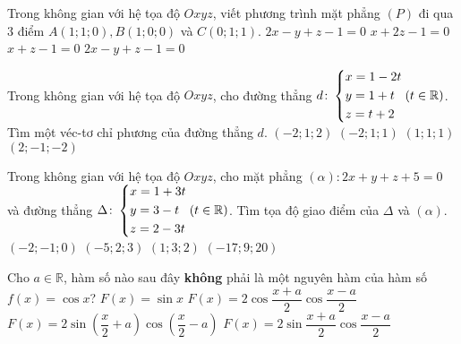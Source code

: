 \begin{ex}%
	Trong không gian với hệ tọa độ $Oxyz$, viết phương trình mặt phẳng $(P)$ đi qua $3$ điểm $A(1;1;0),B(1;0;0)$ và $C(0;1;1)$.
	\choice
	{$2x-y+z-1=0$}
	{$x+2z-1=0$}
	{\True $x+z-1=0$}
	{$2x-y+z-1=0$}
\end{ex}
\begin{ex}%
	Trong không gian với hệ tọa độ $Oxyz$, cho đường thẳng $d \colon \left\{\begin{aligned}&x=1-2t \\&y=1+t \\&z=t+2\end{aligned}\right. (t\in \mathbb{R})$. Tìm một véc-tơ chỉ phương của đường thẳng $d$.
	\choice
	{$(-2;1;2)$}
	{\True $(-2;1;1)$}
	{$(1;1;1)$}
	{$(2;-1;-2)$}
\end{ex}
\begin{ex}%
	Trong không gian với hệ tọa độ $Oxyz$, cho mặt phẳng $(\alpha)\colon 2x+y+z+5=0$ và đường thẳng $ \Delta \colon \left\{\begin{aligned}&x=1+3t \\&y=3-t \\&z=2-3t\end{aligned}\right.(t\in \mathbb{R})$. Tìm tọa độ giao điểm của $ \Delta $ và $\left(\alpha \right)$.
	\choice
	{$(-2;-1;0)$}
	{$(-5;2;3)$}
	{$(1;3;2)$}
	{\True $(-17;9;20)$}
\end{ex}
\begin{ex}%
	Cho $a\in \mathbb{R}$, hàm số nào sau đây \textbf{không} phải là một nguyên hàm của hàm số $f(x)=\cos x$?
	\choice
	{$F(x)=\sin x$}
	{\True $F(x)=2\cos \dfrac{x+a}{2}\cos \dfrac{x-a}{2}$}
	{$F(x)=2\sin \left(\dfrac{x}{2}+a\right)\cos \left(\dfrac{x}{2}-a\right)$}
	{$F(x)=2\sin \dfrac{x+a}{2}\cos \dfrac{x-a}{2}$}
\end{ex}

